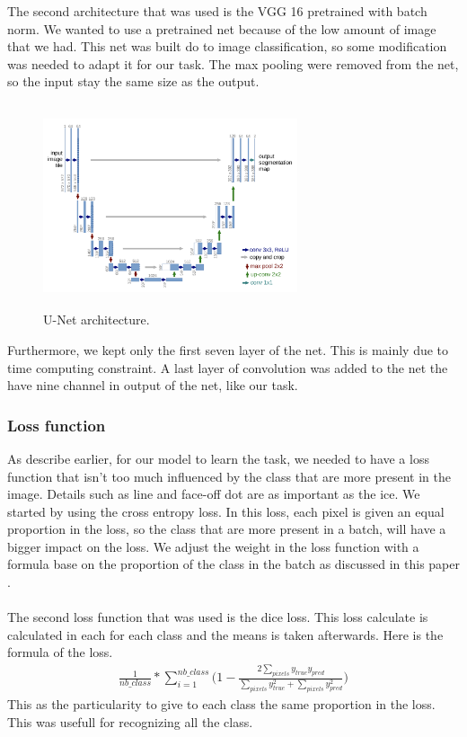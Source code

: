 The second architecture that was used is the VGG 16 pretrained with batch norm. We wanted to use a pretrained net because of the low amount of image that we had. This net was built do to image classification, so some modification was needed to adapt it for our task. The max pooling were removed from the net, so the input stay the same size as the output. 

\begin{figure}[H]
	\centering
	\includegraphics[width=7.5cm,height=6cm]{figures/unet-architecture.png}
	\caption{U-Net architecture.}
	\label{fig:unet}
\end{figure}

Furthermore, we kept only the first seven layer of the net. This is mainly due to time computing constraint. A last layer of convolution was added to the net the have nine channel in output of the net, like our task. 

\subsubsection{Loss function}
As describe earlier, for our model to learn the task, we needed to have a loss function that isn't too much influenced by the class that are more present in the image. Details such as line and face-off dot are as important as the ice. We started by using the cross entropy loss. In this loss, each pixel is given an equal proportion in the loss, so the class that are more present in a batch, will have a bigger impact on the loss. We adjust the weight in the loss function with a formula base on the proportion of the class in the batch as discussed in this paper \cite{Paszke}. \\
\\
The second loss function that was used is the dice loss. This loss calculate is calculated in each for each class and the means is taken afterwards. Here is the formula of the loss.
\begin{gather*}
 \frac{1}{nb\_class}*\sum\limits_{i=1}^{nb\_class}\Big(1-\frac{2\sum\limits_{pixels}y_{true}y_{pred}}{\sum\limits_{pixels}y_{true}^{2}+\sum\limits_{pixels}y_{pred}^{2}}\Big)
\end{gather*}
This as the particularity to give to each class the same proportion in the loss. This was usefull for recognizing all the class.

